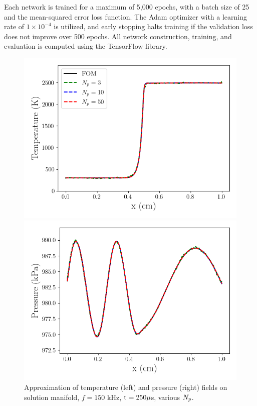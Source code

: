 Each network is trained for a maximum of 5,000 epochs, with a batch size of 25 and the mean-squared error loss function. The Adam optimizer with a learning rate of $1\times10^{-4}$ is utilized, and early stopping halts training if the validation loss does not improve over 500 epochs. All network construction, training, and evaluation is computed using the TensorFlow library.

\begin{figure}
    \begin{minipage}{0.49\linewidth}
        \includegraphics[width=0.99\linewidth]{Chapters/TransientFlame/Images/nonlinear/proj_temp_snaps.png}
    \end{minipage}
    \begin{minipage}{0.49\linewidth}
        \includegraphics[width=0.99\linewidth]{Chapters/TransientFlame/Images/nonlinear/proj_press_snaps.png}
    \end{minipage}
    \caption{\label{fig:flameNonlinProj}Approximation of temperature (left) and pressure (right) fields on solution manifold, $f = 150$ kHz, $\text{t} = 250 \mu$s, various $N_p$.}
\end{figure}

